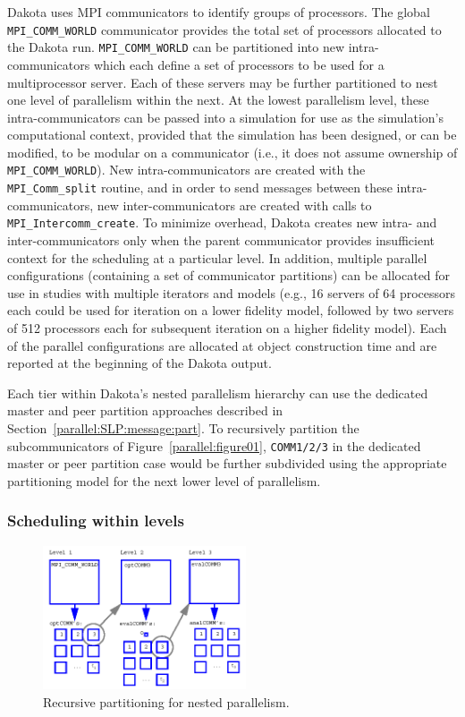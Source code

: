 Dakota uses MPI communicators to identify groups of processors. The
global \texttt{MPI\_COMM\_WORLD} communicator provides the total set
of processors allocated to the Dakota run. \texttt{MPI\_COMM\_WORLD}
can be partitioned into new intra-communicators which each define a
set of processors to be used for a multiprocessor server. Each of
these servers may be further partitioned to nest one level of
parallelism within the next. At the lowest parallelism level, these
intra-communicators can be passed into a simulation for use as the
simulation's computational context, provided that the simulation has
been designed, or can be modified, to be modular on a communicator
(i.e., it does not assume ownership of \texttt{MPI\_COMM\_WORLD}). New
intra-communicators are created with the \texttt{MPI\_Comm\_split}
routine, and in order to send messages between these
intra-communicators, new inter-communicators are created with calls to
\texttt{MPI\_Intercomm\_create}. To minimize overhead, Dakota creates
new intra- and inter-communicators only when the parent communicator
provides insufficient context for the scheduling at a particular
level. In addition, multiple parallel configurations (containing a set
of communicator partitions) can be allocated for use in studies with
multiple iterators and models (e.g., 16 servers of 64 processors each
could be used for iteration on a lower fidelity model, followed by two
servers of 512 processors each for subsequent iteration on a higher
fidelity model).  Each of the parallel configurations are allocated
at object construction time and are reported at the beginning of the
Dakota output.

Each tier within Dakota's nested parallelism hierarchy can use the
dedicated master and peer partition approaches described in
Section~\ref{parallel:SLP:message:part}. To recursively partition the
subcommunicators of Figure~\ref{parallel:figure01},
\texttt{COMM1/2/3} in the dedicated master or peer partition case
would be further subdivided using the appropriate partitioning model
for the next lower level of parallelism.


\subsubsection{Scheduling within levels}\label{parallel:MLP:message:scheduling}

\begin{figure}[ht]
  \centering
  \includegraphics[width=60mm]{images/recursive_partitioning}
  \caption{Recursive partitioning for nested parallelism.}
  \label{parallel:figure02}
\end{figure}

